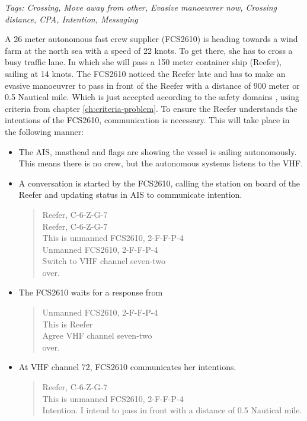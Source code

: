 \emph{Tags: Crossing, Move away from other, Evasive manoeuvrer now, Crossing distance, \ac{CPA}, Intention, Messaging}

A 26 meter autonomous fast crew supplier (FCS2610) is heading towards a wind farm at the north sea with a speed of 22 knots. To get there, she has to cross a busy traffic lane. In which she will pass a 150 meter container ship (Reefer), sailing at 14 knots. The FCS2610 noticed the Reefer late and has to make an evasive manoeuvrer to pass in front of the Reefer with a distance of 900 meter or 0.5 Nautical mile. Which is just accepted according to the safety domains \cite{Szlapczynski2017a}, using criteria from chapter \ref{ch:criteria-problem}.
To ensure the Reefer understands the intentions of the FCS2610, communication is necessary. This will take place in the following manner:
\begin{itemize}
	\item The \ac{AIS}, masthead and flags are showing the vessel is sailing autonomously. This means there is no crew, but the autonomous systems listens to the \ac{VHF}.
	\item A conversation is started by the FCS2610, calling the station on board of the Reefer and updating status in \ac{AIS} to communicate intention. 
		\begin{quote}
			Reefer, C-6-Z-G-7\\
			Reefer, C-6-Z-G-7\\
			This is unmanned FCS2610, 2-F-F-P-4 \\
			Unmanned FCS2610, 2-F-F-P-4 \\
			Switch to VHF channel seven-two\\
			over.
		\end{quote}
	\item The FCS2610 waits for a response from 
		\begin{quote}
			Unmanned FCS2610, 2-F-F-P-4 \\
			This is Reefer\\
			Agree VHF channel seven-two\\
			over.
		\end{quote}
	\item At \ac{VHF} channel 72, FCS2610 communicates her intentions.
		\begin{quote}
			Reefer, C-6-Z-G-7\\
			This is unmanned FCS2610, 2-F-F-P-4 \\
			Intention. I intend to pass in front with a distance of 0.5 Nautical mile.\\

\end{quote}
\end{itemize}
